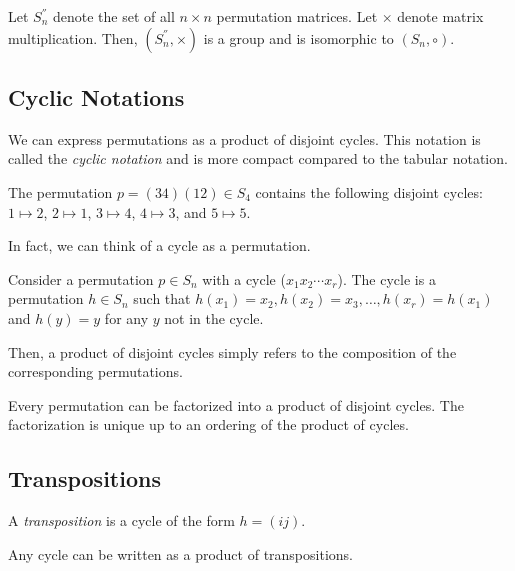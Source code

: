 \documentclass{article}
\begin{document}
\begin{proposition}
  Let $S_n^{''}$ denote the set of all $n \times n$ permutation matrices. Let $\times$ denote matrix multiplication. Then, $(S_n^{''}, \times)$ is a group and is isomorphic to $(S_n, \circ)$.
\end{proposition}

\subsection{Cyclic Notations}

We can express permutations as a product of disjoint cycles. This notation is called the \emph{cyclic notation} and is more compact compared to the tabular notation.

\begin{example}
  The permutation $p = (34)(12) \in S_4$ contains the following disjoint cycles: $1 \mapsto 2$, $2 \mapsto 1$, $3 \mapsto 4$, $4 \mapsto 3$, and $5 \mapsto 5$.
\end{example}

In fact, we can think of a cycle as a permutation.

\begin{definition}
  Consider a permutation $p \in S_n$ with a cycle ($x_1 x_2 \cdots x_r$). The cycle is a permutation $h \in S_n$ such that $h(x_1) = x_2, h(x_2) = x_3, \ldots, h(x_r) = h(x_1)$ and $h(y) = y$ for any $y$ not in the cycle.
\end{definition}

Then, a product of disjoint cycles simply refers to the composition of the corresponding permutations.

\begin{proposition}
  Every permutation can be factorized into a product of disjoint cycles. The factorization is unique up to an ordering of the product of cycles.
\end{proposition}

\subsection{Transpositions}

\begin{definition}
  A \emph{transposition} is a cycle of the form $h = (ij)$.
\end{definition}

\begin{proposition}
  Any cycle can be written as a product of transpositions.
\end{proposition}
\end{document}

